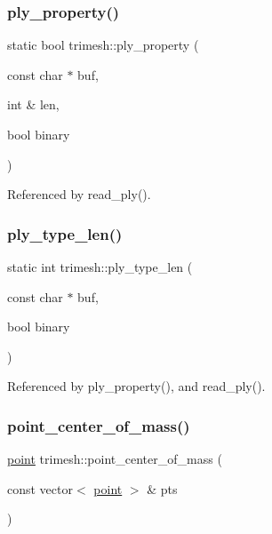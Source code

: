 \mbox{\label{namespacetrimesh_a2675cdbe870a83e10aef9e085dad6ec2}} 
\subsubsection{\texorpdfstring{ply\+\_\+property()}{ply\_property()}}
{\footnotesize\ttfamily static bool trimesh\+::ply\+\_\+property (\begin{DoxyParamCaption}\item[{const char $\ast$}]{buf,  }\item[{int \&}]{len,  }\item[{bool}]{binary }\end{DoxyParamCaption})\hspace{0.3cm}{\ttfamily [static]}}



Referenced by read\+\_\+ply().

\mbox{\label{namespacetrimesh_a1203bd856b8dae134b67074f6c1cfa4b}} 
\subsubsection{\texorpdfstring{ply\+\_\+type\+\_\+len()}{ply\_type\_len()}}
{\footnotesize\ttfamily static int trimesh\+::ply\+\_\+type\+\_\+len (\begin{DoxyParamCaption}\item[{const char $\ast$}]{buf,  }\item[{bool}]{binary }\end{DoxyParamCaption})\hspace{0.3cm}{\ttfamily [static]}}



Referenced by ply\+\_\+property(), and read\+\_\+ply().

\mbox{\label{namespacetrimesh_af868103eab6d05c8f416a0ffaa8a0737}} 
\subsubsection{\texorpdfstring{point\+\_\+center\+\_\+of\+\_\+mass()}{point\_center\_of\_mass()}\hspace{0.1cm}{\footnotesize\ttfamily [1/2]}}
{\footnotesize\ttfamily \hyperlink{namespacetrimesh_a325b99fd6454b22fa4c4bc3223271b2c}{point} trimesh\+::point\+\_\+center\+\_\+of\+\_\+mass (\begin{DoxyParamCaption}\item[{const vector$<$ \hyperlink{namespacetrimesh_a325b99fd6454b22fa4c4bc3223271b2c}{point} $>$ \&}]{pts }\end{DoxyParamCaption})}



